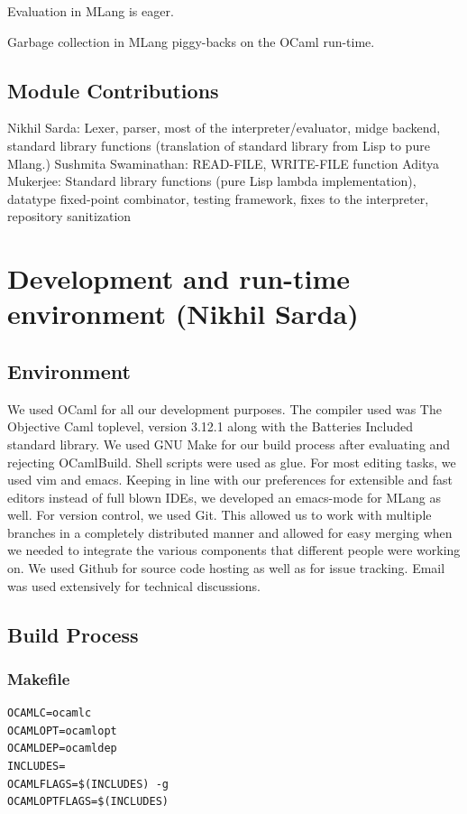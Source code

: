 \documentclass[letterpaper,11pt]{article}
\begin{document}
{Evaluation in MLang is eager.

Garbage collection in MLang piggy-backs on the OCaml run-time.

\subsection{Module Contributions}
Nikhil Sarda: Lexer, parser, most of the interpreter/evaluator, midge backend, standard library functions (translation of standard library from Lisp to pure Mlang.)
Sushmita Swaminathan: READ-FILE, WRITE-FILE function
Aditya Mukerjee: Standard library functions (pure Lisp lambda implementation), datatype fixed-point combinator, testing framework, fixes to the interpreter, repository sanitization


\section{Development and run-time environment (Nikhil Sarda)}

\subsection{Environment}


We used OCaml for all our development purposes. The compiler used was The Objective Caml toplevel, version 3.12.1 along with the Batteries Included
standard library. We used GNU Make for our build process after evaluating and rejecting OCamlBuild. Shell scripts were used as glue.
For most editing tasks, we used vim and emacs. Keeping in line with our preferences for extensible and fast editors instead of full
blown IDEs, we developed an emacs-mode for MLang as well. For version control, we used Git. This allowed us to work with multiple branches in a
completely distributed manner and allowed for easy merging when we needed to integrate the various components that different people were working on.
We used Github for source code hosting as well as for issue tracking. Email was used extensively for technical discussions.

\subsection{Build Process}
\lstset{language=bash}
\subsubsection{Makefile}
\begin{lstlisting}
OCAMLC=ocamlc
OCAMLOPT=ocamlopt
OCAMLDEP=ocamldep
INCLUDES=
OCAMLFLAGS=$(INCLUDES) -g
OCAMLOPTFLAGS=$(INCLUDES)


\end{lstlisting}}
\end{document}
